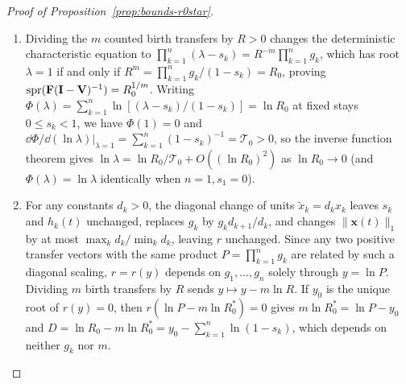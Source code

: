 \begin{proof}[Proof of Proposition~{\upshape\ref{prop:bounds-r0star}}]
\begin{enumerate}
\item[(a)] Dividing the $m$ counted birth transfers by $R > 0$ changes the deterministic characteristic equation to $\prod_{k=1}^n (\lambda - s_k) = R^{-m}\prod_{k=1}^n g_k$, which has root $\lambda = 1$ if and only if $R^m = \prod_{k=1}^n g_k/(1 - s_k) = R_0$, proving $\operatorname{spr}(\mathbf{F}(\mathbf{I} - \mathbf{V})^{-1}) = R_0^{1/m}$. Writing $\Phi(\lambda) = \sum_{k=1}^n \ln[(\lambda - s_k)/(1 - s_k)] = \ln R_0$ at fixed stays $0 \le s_k < 1$, we have $\Phi(1) = 0$ and $\dd\Phi/\dd(\ln\lambda)|_{\lambda=1} = \sum_{k=1}^n (1 - s_k)^{-1} = \mathcal{T}_0 > 0$, so the inverse function theorem gives $\ln\lambda = \ln R_0 / \mathcal{T}_0 + O((\ln R_0)^2)$ as $\ln R_0 \to 0$ (and $\Phi(\lambda) = \ln\lambda$ identically when $n = 1, s_1 = 0$).
\item[(b)] For any constants $d_k > 0$, the diagonal change of units $\tilde{x}_k = d_k x_k$ leaves $s_k$ and $h_k(t)$ unchanged, replaces $g_k$ by $g_k d_{k+1}/d_k$, and changes $\|\mathbf{x}(t)\|_1$ by at most $\max_k d_k / \min_k d_k$, leaving $r$ unchanged. Since any two positive transfer vectors with the same product $P = \prod_{k=1}^n g_k$ are related by such a diagonal scaling, $r = r(y)$ depends on $g_1, \dots, g_n$ solely through $y = \ln P$. Dividing $m$ birth transfers by $R$ sends $y \mapsto y - m\ln R$. If $y_0$ is the unique root of $r(y) = 0$, then $r(\ln P - m\ln R_0^*) = 0$ gives $m\ln R_0^* = \ln P - y_0$ and $D = \ln R_0 - m\ln R_0^* = y_0 - \sum_{k=1}^n \ln(1 - s_k)$, which depends on neither $g_k$ nor $m$.


\end{enumerate}
\end{proof}

